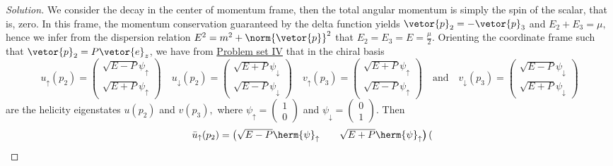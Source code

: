 \begin{proof}[Solution]
   We consider the decay in the center of momentum frame, then the total angular momentum is simply the spin of the scalar, that is, zero. In this frame, the momentum conservation guaranteed by the delta function yields \(\vetor{p}_2 = -\vetor{p}_3\) and \(E_2 + E_3 = \mu,\) hence we infer from the dispersion relation \(E^2 = m^2 + \norm{\vetor{p}}^2\) that \(E_2 = E_3 = E = \frac{\mu}{2}.\) Orienting the coordinate frame such that \(\vetor{p}_2 = P\vetor{e}_z\), we have from \href{https://github.com/louisradial/4305107-quantum-field-theory-i/releases/tag/pset4}{Problem set IV} that in the chiral basis
   \begin{equation*}
      u_{\uparrow}(p_2) = \begin{pmatrix}
         \sqrt{E - P} \psi_{\uparrow}\\
         \sqrt{E + P} \psi_{\uparrow}
      \end{pmatrix} \quad
      u_{\downarrow}(p_2) = \begin{pmatrix}
         \sqrt{E + P} \psi_{\downarrow}\\
         \sqrt{E - P} \psi_{\downarrow}
      \end{pmatrix}\quad
      v_{\uparrow}(p_3) = \begin{pmatrix}
         \sqrt{E + P} \psi_{\uparrow}\\
         \sqrt{E - P} \psi_{\uparrow}
      \end{pmatrix} \quad\text{and}\quad
      v_{\downarrow}(p_3) = \begin{pmatrix}
         \sqrt{E - P} \psi_{\downarrow}\\
         \sqrt{E + P} \psi_{\downarrow}
      \end{pmatrix}
   \end{equation*}
   are the helicity eigenstates \(u(p_2)\) and \(v(p_3),\) where \(\psi_{\uparrow} = (\begin{smallmatrix}1\\0 \end{smallmatrix})\) and \(\psi_{\downarrow} = (\begin{smallmatrix}0\\1\end{smallmatrix})\). Then
   \begin{equation*}
      \bar{u}_{\uparrow}(p_2) = \begin{pmatrix}
         \sqrt{E - P}\herm{\psi}_{\uparrow} && \sqrt{E + P}\herm{\psi}_{\uparrow}
      \end{pmatrix}
      \begin{pmatrix}

\end{pmatrix}
\end{equation*}
\end{proof}
